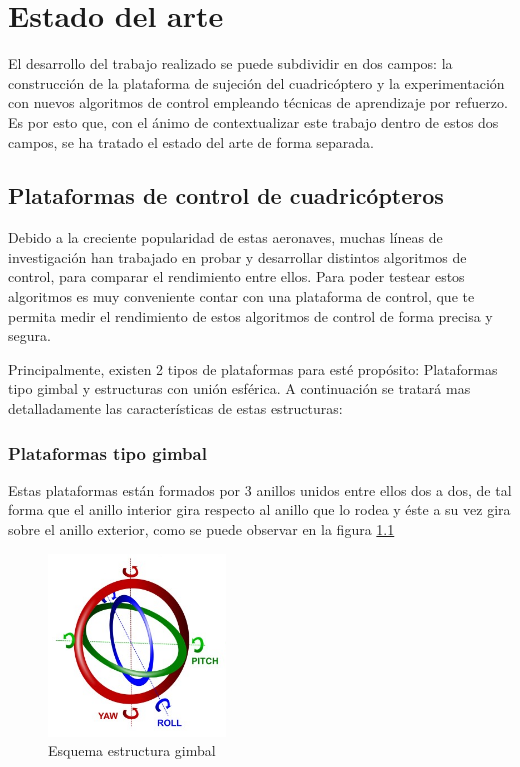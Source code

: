 \chapter{Estado del arte}

El desarrollo del trabajo realizado se puede subdividir en dos campos: la construcción de la plataforma de sujeción del cuadricóptero y la experimentación con nuevos algoritmos de control empleando técnicas de aprendizaje por refuerzo. Es por esto que, con el ánimo de contextualizar este trabajo dentro de estos dos campos, se ha tratado el estado del arte de forma separada.

\section{Plataformas de control de cuadricópteros}

Debido a la creciente popularidad de estas aeronaves, muchas líneas de investigación han trabajado en probar y desarrollar distintos algoritmos de control, para comparar el rendimiento entre ellos. Para poder testear estos algoritmos es muy conveniente contar con una plataforma de control, que te permita medir el rendimiento de estos algoritmos de control de forma precisa y segura.

Principalmente, existen 2 tipos de plataformas para esté propósito: Plataformas tipo gimbal y estructuras con unión esférica. A continuación se tratará mas detalladamente las características de estas estructuras:

\subsection{Plataformas tipo gimbal}

Estas plataformas están formados por 3 anillos unidos entre ellos dos a dos, de tal forma que el anillo interior gira respecto al anillo que lo rodea y éste a su vez gira sobre el anillo exterior, como se puede observar en la figura \ref{gimbal}

\begin{figure}[htb!]
	\centering
	\includegraphics[width=0.42\textwidth]{estadodelarte/gimbal}
	\caption{Esquema estructura gimbal}
	\label{gimbal}
\end{figure}

